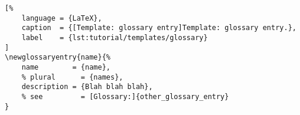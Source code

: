 
\begin{lstlisting}[%
    language = {LaTeX},
    caption  = {[Template: glossary entry]Template: glossary entry.},
    label    = {lst:tutorial/templates/glossary}
]
\newglossaryentry{name}{%
    name        = {name},
    % plural      = {names},
    description = {Blah blah blah},
    % see         = [Glossary:]{other_glossary_entry}
}
\end{lstlisting}